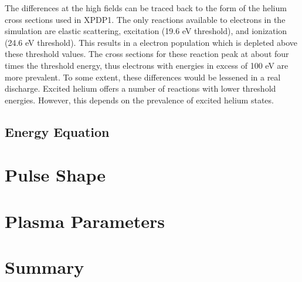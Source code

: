 The differences at the high fields can be traced back to the form of the helium
cross sections used in XPDP1. The only reactions available to electrons in the
simulation are elastic scattering, excitation (19.6 eV threshold), and
ionization (24.6 eV threshold). This results in a electron population which is
depleted above these threshold values. The cross sections for these reaction
peak at about four times the threshold energy, thus electrons with energies
in excess of 100 eV are more prevalent. To some extent, these differences would
be lessened in a real discharge. Excited helium offers a number of reactions
with lower threshold energies. However, this depends on the prevalence of
excited helium states.



\subsection{Energy Equation}



\section{Pulse Shape}



\section{Plasma Parameters}



\section{Summary}




